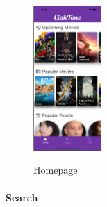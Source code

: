 \documentclass[12pt, a4paper]{article}
\numberwithin{figure}{section}
\begin{document}
\begin{center}
	\begin{figure}[H]
		\centering
		\includegraphics[width=0.23\textwidth]{images/final/home.png}\\
		\caption{Homepage}
	\end{figure}
\end{center}


\paragraph{Search}
\end{document}
